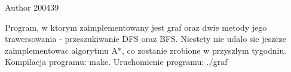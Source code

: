 \begin{DoxyAuthor}{\-Author}
200439
\end{DoxyAuthor}
\-Program, w ktorym zaimplementowany jest graf oraz dwie metody jego trawersowania -\/ przeszukiwanie \-D\-F\-S oraz \-B\-F\-S. \-Niestety nie udalo sie jeszcze zaimplementowac algorytmu \-A$\ast$, co zostanie zrobione w przyszlym tygodniu. \-Kompilacja programu\-: make. \-Uruchomienie programu\-: ./graf 